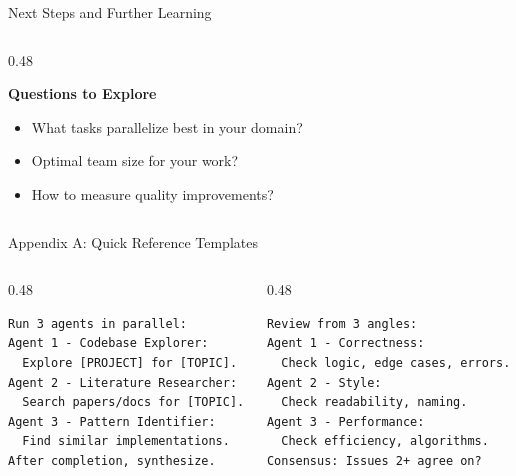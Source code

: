 \documentclass[aspectratio=169,11pt]{beamer}
\begin{document}
\begin{frame}{Next Steps and Further Learning}
\begin{columns}[T]
\begin{column}{0.48\textwidth}

            \vspace{0.3cm}
            \textbf{Questions to Explore}
            \begin{itemize}
                \footnotesize
                \item What tasks parallelize best in your domain?
                \item Optimal team size for your work?
                \item How to measure quality improvements?
            \end{itemize}
        \end{column}
    \end{columns}
\end{frame}

\appendix

\begin{frame}[fragile]{Appendix A: Quick Reference Templates}
    \begin{columns}[T]
        \begin{column}{0.48\textwidth}
\begin{lstlisting}[style=prompt,title={\footnotesize Three-Agent Research}]
Run 3 agents in parallel:
Agent 1 - Codebase Explorer:
  Explore [PROJECT] for [TOPIC].
Agent 2 - Literature Researcher:
  Search papers/docs for [TOPIC].
Agent 3 - Pattern Identifier:
  Find similar implementations.
After completion, synthesize.
\end{lstlisting}
        \end{column}
        \begin{column}{0.48\textwidth}
\begin{lstlisting}[style=prompt,title={\footnotesize Code Review Panel}]
Review from 3 angles:
Agent 1 - Correctness:
  Check logic, edge cases, errors.
Agent 2 - Style:
  Check readability, naming.
Agent 3 - Performance:
  Check efficiency, algorithms.
Consensus: Issues 2+ agree on?
\end{lstlisting}
\end{column}
    \end{columns}
\end{frame}
\end{document}
